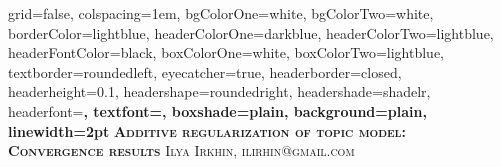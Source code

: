 \documentclass[portrait,final,a1paper,fontscale=0.401]{baposter}
\begin{document}
\begin{poster}%
  {
  grid=false,
  colspacing=1em,
  bgColorOne=white,
  bgColorTwo=white,
  borderColor=lightblue,
  headerColorOne=darkblue,
  headerColorTwo=lightblue,
  headerFontColor=black,
  boxColorOne=white,
  boxColorTwo=lightblue,
  textborder=roundedleft,
  eyecatcher=true,
  headerborder=closed,
  headerheight=0.1\textheight,
  headershape=roundedright,
  headershade=shadelr,
  headerfont=\Large\bf\textsc, %
  textfont={\setlength{\parindent}{0.5em}},
  boxshade=plain,
  background=plain,
  linewidth=2pt
  }
  {} 
  {\bf\textsc{Additive regularization of topic model: \\ Convergence results}\vspace{0.5em}}
  {\textsc{Ilya Irkhin, ilirhin@gmail.com }}
  {%
  }

    
    \newcommand{\colouredcircle}{%
      \tikz{\useasboundingbox (-0.2em,-0.32em) rectangle(0.2em,0.32em); \draw[draw=headerColorOne,fill=lightblue,line width=0.03em] (0,0) circle(0.18em);}}


\end{poster}
\end{document}
